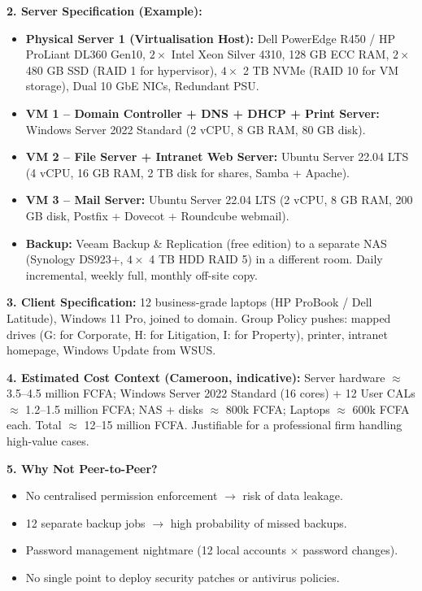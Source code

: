 \documentclass[11pt]{article}
\begin{document}
\begin{exoresolu}
\textbf{2. Server Specification (Example):}
\begin{itemize}
\item \textbf{Physical Server 1 (Virtualisation Host):} Dell PowerEdge R450 / HP ProLiant DL360 Gen10, $2\times$ Intel Xeon Silver 4310, 128 GB ECC RAM, $2\times$ 480 GB SSD (RAID 1 for hypervisor), $4\times$ 2 TB NVMe (RAID 10 for VM storage), Dual 10 GbE NICs, Redundant PSU.
\item \textbf{VM 1 -- Domain Controller + DNS + DHCP + Print Server:} Windows Server 2022 Standard (2 vCPU, 8 GB RAM, 80 GB disk).
\item \textbf{VM 2 -- File Server + Intranet Web Server:} Ubuntu Server 22.04 LTS (4 vCPU, 16 GB RAM, 2 TB disk for shares, Samba + Apache).
\item \textbf{VM 3 -- Mail Server:} Ubuntu Server 22.04 LTS (2 vCPU, 8 GB RAM, 200 GB disk, Postfix + Dovecot + Roundcube webmail).
\item \textbf{Backup:} Veeam Backup \& Replication (free edition) to a separate NAS (Synology DS923+, $4\times$ 4 TB HDD RAID 5) in a different room. Daily incremental, weekly full, monthly off-site copy.
\end{itemize}

\textbf{3. Client Specification:}
12 business-grade laptops (HP ProBook / Dell Latitude), Windows 11 Pro, joined to domain. Group Policy pushes: mapped drives (G: for Corporate, H: for Litigation, I: for Property), printer, intranet homepage, Windows Update from WSUS.

\textbf{4. Estimated Cost Context (Cameroon, indicative):}
Server hardware $\approx$ 3.5--4.5 million FCFA; Windows Server 2022 Standard (16 cores) + 12 User CALs $\approx$ 1.2--1.5 million FCFA; NAS + disks $\approx$ 800k FCFA; Laptops $\approx$ 600k FCFA each. Total $\approx$ 12--15 million FCFA. Justifiable for a professional firm handling high-value cases.

\textbf{5. Why Not Peer-to-Peer?}
\begin{itemize}
\item No centralised permission enforcement $\rightarrow$ risk of data leakage.
\item 12 separate backup jobs $\rightarrow$ high probability of missed backups.
\item Password management nightmare (12 local accounts $\times$ password changes).
\item No single point to deploy security patches or antivirus policies.
\end{itemize}
\end{exoresolu}
\end{document}
